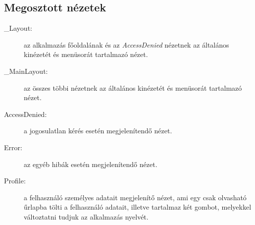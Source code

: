 \subsection{Megosztott nézetek}
\begin{description}
	\item[\_Layout:] az alkalmazás főoldalának és az \emph{AccessDenied} nézetnek az általános kinézetét és menüsorát tartalmazó nézet.
	\item[\_MainLayout:] az összes többi nézetnek az általános kinézetét és menüsorát tartalmazó nézet.
	\item[AccessDenied:] a jogosulatlan kérés esetén megjelenítendő nézet.
	\item[Error:] az egyéb hibák esetén megjelenítendő nézet.
	\item[Profile:] a felhasználó személyes adatait megjelenítő nézet, ami egy csak olvasható űrlapba tölti a felhasználó adatait, illetve tartalmaz két gombot, melyekkel változtatni tudjuk az alkalmazás nyelvét.
\end{description}
